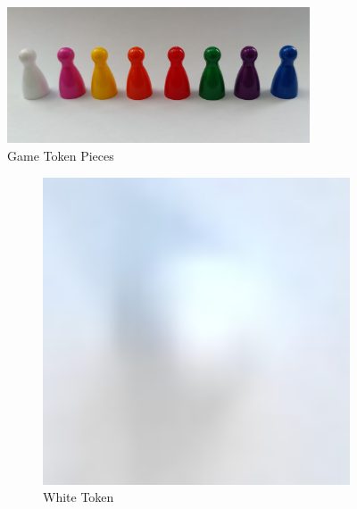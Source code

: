 \documentclass[12pt]{article}
\begin{document}
\begin{figure}[h]
    \centering
    \includegraphics[width=0.8\textwidth]{images/figures/fig9}
    \caption{Game Token Pieces}
    \label{fig:tokens}
\end{figure}

\begin{figure}[H]
    \centering
    \begin{subfigure}{0.2\textwidth}
        \includegraphics[width=1\textwidth]{images/figures/fig10a}
        \caption{White Token}
        \label{fig:tokencolora}
    \end{subfigure}
    \begin{subfigure}{0.2\textwidth}

\end{subfigure}
\end{figure}
\end{document}
